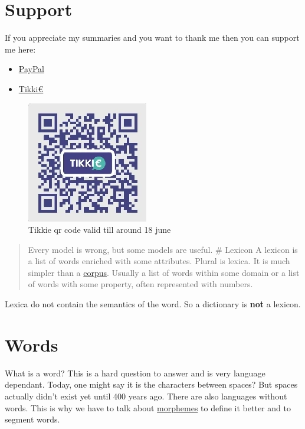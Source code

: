 \documentclass[
  11pt,
  british,
]{article}
\providecommand{\tightlist}{%
  \setlength{\itemsep}{0pt}\setlength{\parskip}{0pt}}
\begin{document}
\hypertarget{support}{%
\section{Support}\label{support}}

If you appreciate my summaries and you want to thank me then you can
support me here:

\begin{itemize}
\tightlist
\item
  \href{https://www.paypal.me/quintencabo}{PayPal}
\item
  \href{https://tikkie.me/pay/c3cp0dcfd8mautn8ud79}{Tikki€}
\end{itemize}

\begin{figure}
\centering
\includegraphics{tikki.png}
\caption{Tikkie qr code valid till around 18 june}
\end{figure}

\begin{quote}
Every model is wrong, but some models are useful. \# Lexicon A lexicon
is a list of words enriched with some attributes. Plural is lexica. It
is much simpler than a \href{Corpus.md}{corpus}. Usually a list of words
within some domain or a list of words with some property, often
represented with numbers.
\end{quote}

Lexica do not contain the semantics of the word. So a dictionary is
\textbf{not} a lexicon.

\hypertarget{words}{%
\section{Words}\label{words}}

What is a word? This is a hard question to answer and is very language
dependant. Today, one might say it is the characters between spaces? But
spaces actually didn't exist yet until 400 years ago. There are also
languages without words. This is why we have to talk about
\href{Morphemes.md}{morphemes} to define it better and to segment words.
\end{document}

